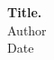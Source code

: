 \documentclass[12pt]{report}
\begin{document}
	
	\begin{center}
		\textbf{Title.} \\[8pt]
		\small{Author} \\
		\small{Date} \\
	\end{center}
	
	

	
	
\end{document}
